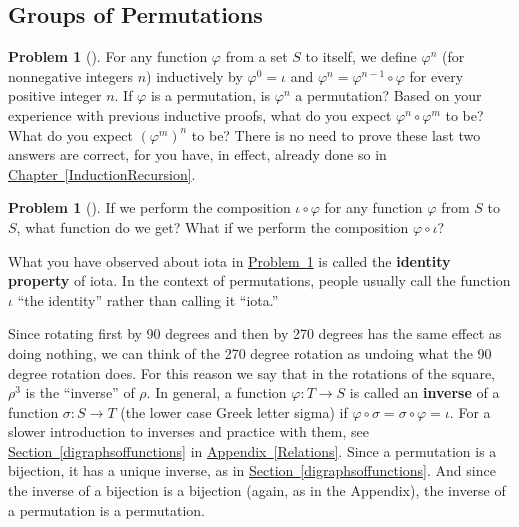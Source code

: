 \documentclass[10pt,]{book}
\newcommand{\terminology}[1]{\textbf{#1}}
\theoremstyle{plain}
\theoremstyle{definition}
\newtheorem{activity}[project]{Problem}
\theoremstyle{definition}
\numberwithin{equation}{chapter}
\begin{document}
\subsection[{Groups of Permutations}]{Groups of Permutations}\label{subsection-59}
\begin{activity}[] \label{activity-250}
For any function \(\varphi\) from a set \(S\) to itself, we define \(\varphi^n\) (for nonnegative integers \(n\)) inductively by \(\varphi^0 =
\iota\) and \(\varphi^n = \varphi^{n-1}\circ\varphi\) for every positive integer \(n\). If \(\varphi\) is a permutation, is \(\varphi^n\) a permutation? Based on your experience with previous inductive proofs, what do you expect \(\varphi^n\circ \varphi^m\) to be? What do you expect \((\varphi^m)^n\) to be? There is no need to prove these last two answers are correct, for you have, in effect, already done so in \hyperref[InductionRecursion]{Chapter~\ref{InductionRecursion}}.%
\end{activity}
\begin{activity}[] \label{identityproperty}
If we perform the composition \(\iota\circ \varphi\) for any function \(\varphi\) from \(S\) to \(S\), what function do we get? What if we perform the composition \(\varphi\circ\iota\)?%
\end{activity}
What you have observed about iota in \hyperref[identityproperty]{Problem~\ref{identityproperty}} is called the \terminology{identity property} of iota. In the context of permutations, people usually call the function \(\iota\) ``the identity'' rather than calling it ``iota.''%
\par
Since rotating first by 90 degrees and then by 270 degrees has the same effect as doing nothing, we can think of the 270 degree rotation as undoing what the 90 degree rotation does. For this reason we say that in the rotations of the square, \(\rho^3\) is the ``inverse'' of \(\rho\). In general, a function \(\varphi:T\rightarrow S\) is called an \terminology{inverse} of a function \(\sigma:S
\rightarrow T\) (the lower case Greek letter sigma) if \(\varphi\circ \sigma= \sigma
\circ\varphi =
\iota\). For a slower introduction to inverses and practice with them, see \hyperref[digraphsoffunctions]{Section~\ref{digraphsoffunctions}} in \hyperref[Relations]{Appendix~\ref{Relations}}.  Since a permutation is a bijection, it has a unique inverse, as in \hyperref[digraphsoffunctions]{Section~\ref{digraphsoffunctions}}.  And since the inverse of a bijection is a bijection (again, as in the Appendix), the inverse of a permutation is a permutation.%
\end{document}
